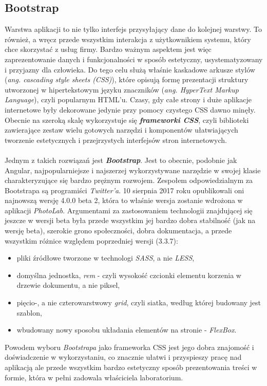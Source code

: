 \subsection{Bootstrap}
\quad Warstwa aplikacji to nie tylko interfejs przysyłający dane do kolejnej warstwy. To również, a wręcz przede wszystkim interakcja z użytkownikiem systemu, który chce skorzystać z usług firmy. Bardzo ważnym aspektem jest więc zaprezentowanie danych i funkcjonalności w sposób estetyczny, usystematyzowany i przyjazny dla człowieka. Do tego celu służą właśnie kaskadowe arkusze stylów (\textit{ang. cascading style sheets (CSS)}), które opisują formę prezentacji struktury utworzonej w hipertekstowym języku znaczników (\textit{ang. HyperText Markup Language}), czyli popularnym HTML'u. Czasy, gdy całe strony i duże aplikacje internetowe były dekorowane jedynie przy pomocy czystego CSS dawno minęły. Obecnie na szeroką skalę wykorzystuje się \textbf{\textit{frameworki CSS}}, czyli biblioteki zawierające zestaw wielu gotowych narzędzi i komponentów ułatwiających tworzenie estetycznych i przejrzystych interfejsów stron internetowych. \\
\\
Jednym z takich rozwiązań jest \textbf{\textit{Bootstrap}}. Jest to obecnie, podobnie jak Angular, najpopularniejsze i najszerzej wykorzystywane narzędzie w swojej klasie charakteryzujące się bardzo prężnym rozwojem. Zespołem odpowiedzialnym za Bootstrapa są programiści \textit{Twitter'a}. 10 sierpnia 2017 roku opublikowali oni najnowszą wersję 4.0.0 beta 2, która to właśnie wersja zostanie wdrożona w aplikacji \textit{PhotoLab}. Argumentami za zastosowaniem technologii znajdującej się jeszcze w wersji beta była przede wszystkim jej bardzo dobra stabilność (jak na wersję beta), szerokie grono społeczności, dobra dokumentacja, a przede wszystkim różnice względem poprzedniej wersji (3.3.7):
\begin{itemize}
    \item pliki źródłowe tworzone w technologi \textit{SASS}, a nie \textit{LESS},
    \item domyślna jednostka, \textit{rem} - czyli wysokość czcionki elementu korzenia w drzewie dokumentu, a nie piksel,
    \item pięcio-, a nie czterowarstwowy \textit{grid}, czyli siatka, według której budowany jest szablon,
    \item wbudowany nowy sposobu układania elementów na stronie - \textit{FlexBox}.
\end{itemize}
Powodem wyboru \textit{Bootstrapa} jako frameworka CSS jest jego dobra znajomość i doświadczenie w wykorzystaniu, co znacznie ułatwi i przyspieszy pracę nad aplikacją ale przede wszystkim bardzo estetyczny sposób prezentowania treści w formie, która w pełni zadowala właściciela laboratorium.

